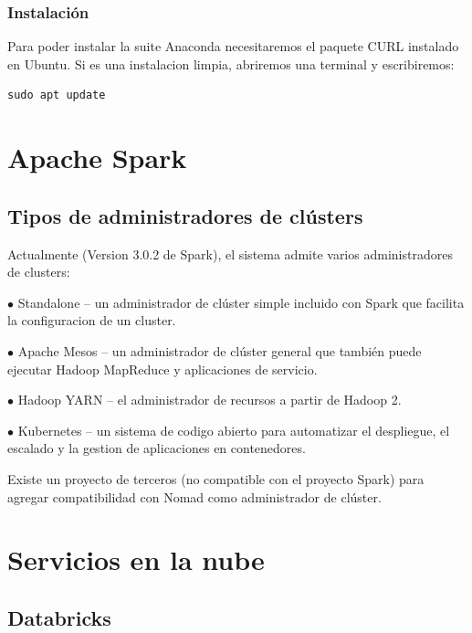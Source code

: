 \documentclass[a4paper,10pt]{article}
\begin{document}
\subsubsection{Instalación}

Para poder instalar la suite Anaconda necesitaremos el paquete CURL instalado en Ubuntu. Si es una instalacion limpia, abriremos una terminal y escribiremos:

\lstset{language=bash, breaklines=true, basicstyle=\ttfamily}
\begin{lstlisting}[frame=single]
sudo apt update
\end{lstlisting}

\clearpage

\section{Apache Spark}

\subsection{Tipos de administradores de clústers}

Actualmente (Version 3.0.2 de Spark), el sistema admite varios administradores de clusters:

$\bullet$ Standalone – un administrador de clúster simple incluido con Spark que facilita la configuracion de un cluster.

$\bullet$ Apache Mesos – un administrador de clúster general que también puede ejecutar Hadoop MapReduce y aplicaciones de servicio.

$\bullet$ Hadoop YARN – el administrador de recursos a partir de Hadoop 2.

$\bullet$ Kubernetes – un sistema de codigo abierto para automatizar el despliegue, el escalado y la gestion de aplicaciones en contenedores.

Existe un proyecto de terceros (no compatible con el proyecto Spark) para agregar compatibilidad con Nomad como administrador de clúster.





\section{Servicios en la nube}

\subsection{Databricks}
\end{document}
